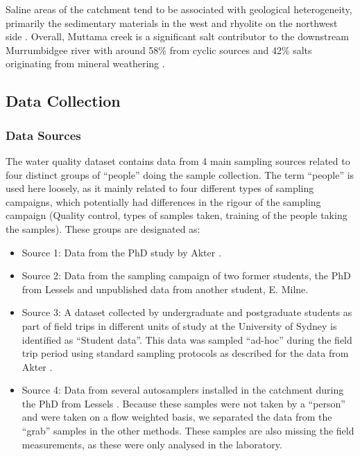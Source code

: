 \documentclass[, manuscript]{copernicus}
\begin{document}
Saline areas of the catchment tend to be associated with geological
heterogeneity, primarily the sedimentary materials in the west and
rhyolite on the northwest side \citep{Conyers2008}. Overall, Muttama
creek is a significant salt contributor to the downstream Murrumbidgee
river with around 58\% from cyclic sources and 42\% salts originating
from mineral weathering \citep{Conyers2008}.

\subsection{Data Collection}

\subsubsection{Data Sources}

The water quality dataset contains data from 4 main sampling sources
related to four distinct groups of ``people'' doing the sample
collection. The term ``people'' is used here loosely, as it mainly
related to four different types of sampling campaigns, which potentially
had differences in the rigour of the sampling campaign (Quality control,
types of samples taken, training of the people taking the samples).
These groups are designated as:

\begin{itemize}
\item
  Source 1: Data from the PhD study by Akter \citeyearpar{Akter2018}.
\item
  Source 2: Data from the sampling campaign of two former students, the
  PhD from Lessels \citeyearpar{Lessels2014} and unpublished data from
  another student, E. Milne.
\item
  Source 3: A dataset collected by undergraduate and postgraduate
  students as part of field trips in different units of study at the
  University of Sydney is identified as ``Student data''. This data was
  sampled ``ad-hoc'' during the field trip period using standard
  sampling protocols as described for the data from Akter
  \citeyearpar{Akter2018}.
\item
  Source 4: Data from several autosamplers installed in the catchment
  during the PhD from Lessels \citeyearpar{Lessels2014}. Because these
  samples were not taken by a ``person'' and were taken on a flow
  weighted basis, we separated the data from the ``grab'' samples in the
  other methods. These samples are also missing the field measurements,
  as these were only analysed in the laboratory.
\end{itemize}
\end{document}
